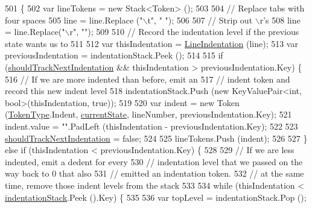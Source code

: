 \begin{DoxyCode}
501         \{
502             var lineTokens = \textcolor{keyword}{new} Stack<Token> ();
503 
504             \textcolor{comment}{// Replace tabs with four spaces}
505             line = line.Replace (\textcolor{stringliteral}{"\(\backslash\)t"}, \textcolor{stringliteral}{"    "});
506 
507             \textcolor{comment}{// Strip out \(\backslash\)r's}
508             line = line.Replace(\textcolor{stringliteral}{"\(\backslash\)r"}, \textcolor{stringliteral}{""});
509 
510             \textcolor{comment}{// Record the indentation level if the previous state wants us to}
511 
512             var thisIndentation = \hyperlink{a00099_a4079b10b099e5d85f5482f9e7eac4179}{LineIndentation} (line);
513             var previousIndentation = indentationStack.Peek ();
514 
515             \textcolor{keywordflow}{if} (\hyperlink{a00099_ac670aac2245cbd4694dfbd5b69313218}{shouldTrackNextIndentation} && thisIndentation > 
      previousIndentation.Key) \{
516                 \textcolor{comment}{// If we are more indented than before, emit an}
517                 \textcolor{comment}{// indent token and record this new indent level}
518                 indentationStack.Push (\textcolor{keyword}{new} KeyValuePair<int, bool>(thisIndentation, \textcolor{keyword}{true}));
519 
520                 var indent = \textcolor{keyword}{new} Token (\hyperlink{a00029_a301aa7c866593a5b625a8fc158bbeace}{TokenType}.Indent, \hyperlink{a00099_ac90b7dce8103425a148f9e8588f14137}{currentState}, lineNumber, 
      previousIndentation.Key);
521                 indent.value = \textcolor{stringliteral}{""}.PadLeft (thisIndentation - previousIndentation.Key);
522 
523                 \hyperlink{a00099_ac670aac2245cbd4694dfbd5b69313218}{shouldTrackNextIndentation} = \textcolor{keyword}{false};
524 
525                 lineTokens.Push (indent);
526 
527             \} \textcolor{keywordflow}{else} \textcolor{keywordflow}{if} (thisIndentation < previousIndentation.Key) \{
528 
529                 \textcolor{comment}{// If we are less indented, emit a dedent for every}
530                 \textcolor{comment}{// indentation level that we passed on the way back to 0 that also}
531                 \textcolor{comment}{// emitted an indentation token.}
532                 \textcolor{comment}{// at the same time, remove those indent levels from the stack}
533 
534                 \textcolor{keywordflow}{while} (thisIndentation < \hyperlink{a00099_a6631a1b1a9109258ab18927e7587ff9b}{indentationStack}.Peek ().Key) \{
535 
536                     var topLevel = indentationStack.Pop ();

\end{DoxyCode}
